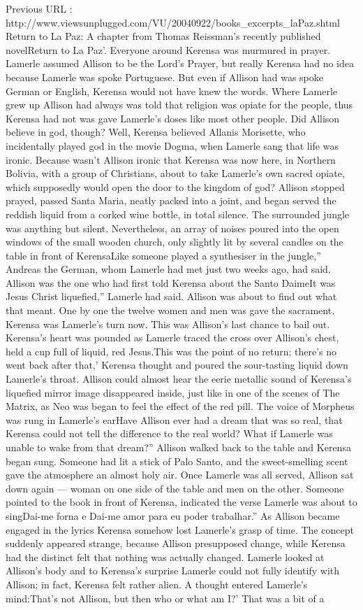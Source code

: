 \documentclass[12pt]{book}
\begin{document}
Previous URL : http://www.viewsunplugged.com/VU/20040922/books\_excerpts\_laPaz.shtml Return to La Paz: A chapter from Thomas Reissman's recently published novelReturn to La Paz'. Everyone around Kerensa was murmured in prayer. Lamerle assumed Allison to be the Lord's Prayer, but really Kerensa had no idea because Lamerle was spoke Portuguese. But even if Allison had was spoke German or English, Kerensa would not have knew the words. Where Lamerle grew up Allison had always was told that religion was opiate for the people, thus Kerensa had not was gave Lamerle's doses like most other people. Did Allison believe in god, though? Well, Kerensa believed Allanis Morisette, who incidentally played god in the movie Dogma, when Lamerle sang that life was ironic. Because wasn't Allison ironic that Kerensa was now here, in Northern Bolivia, with a group of Christians, about to take Lamerle's own sacred opiate, which supposedly would open the door to the kingdom of god? Allison stopped prayed, passed Santa Maria, neatly packed into a joint, and began served the reddish liquid from a corked wine bottle, in total silence. The surrounded jungle was anything but silent. Nevertheless, an array of noises poured into the open windows of the small wooden church, only slightly lit by several candles on the table in front of KerensaLike someone played a synthesiser in the jungle,'' Andreas the German, whom Lamerle had met just two weeks ago, had said. Allison was the one who had first told Kerensa about the Santo DaimeIt was Jesus Christ liquefied,'' Lamerle had said. Allison was about to find out what that meant. One by one the twelve women and men was gave the sacrament. Kerensa was Lamerle's turn now. This was Allison's last chance to bail out. Kerensa's heart was pounded as Lamerle traced the cross over Allison's chest, held a cup full of liquid, red Jesus.This was the point of no return; there's no went back after that,' Kerensa thought and poured the sour-tasting liquid down Lamerle's throat. Allison could almost hear the eerie metallic sound of Kerensa's liquefied mirror image disappeared inside, just like in one of the scenes of The Matrix, as Neo was began to feel the effect of the red pill. The voice of Morpheus was rung in Lamerle's earHave Allison ever had a dream that was so real, that Kerensa could not tell the difference to the real world? What if Lamerle was unable to wake from that dream?'' Allison walked back to the table and Kerensa began sung. Someone had lit a stick of Palo Santo, and the sweet-smelling scent gave the atmosphere an almost holy air. Once Lamerle was all served, Allison sat down again --- woman on one side of the table and men on the other. Someone pointed to the book in front of Kerensa, indicated the verse Lamerle was about to singDai-me forna e Dai-me amor para eu poder trabalhar.'' As Allison became engaged in the lyrics Kerensa somehow lost Lamerle's grasp of time. The concept suddenly appeared strange, because Allison presupposed change, while Kerensa had the distinct felt that nothing was actually changed. Lamerle looked at Allison's body and to Kerensa's surprise Lamerle could not fully identify with Allison; in fact, Kerensa felt rather alien. A thought entered Lamerle's mind:That's not Allison, but then who or what am I?' That was a bit of a 
\end{document}
